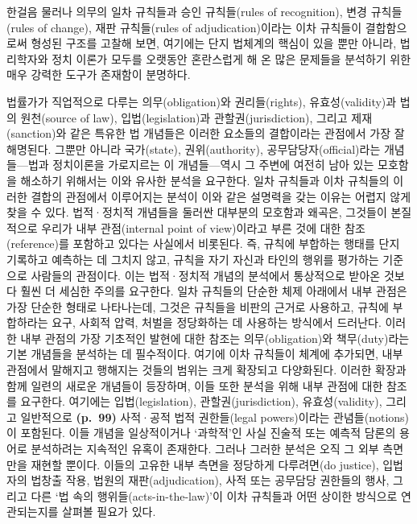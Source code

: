 한걸음 물러나 의무의 일차 규칙들과 승인 규칙들(rules of recognition),
변경 규칙들(rules of change), 재판 규칙들(rules of adjudication)이라는
이차 규칙들이 결합함으로써 형성된 구조를 고찰해 보면, 여기에는 단지
법체계의 핵심이 있을 뿐만 아니라, 법리학자와 정치 이론가 모두를 오랫동안
혼란스럽게 해 온 많은 문제들을 분석하기 위한 매우 강력한 도구가 존재함이
분명하다.

법률가가 직업적으로 다루는 의무(obligation)와 권리들(rights),
유효성(validity)과 법의 원천(source of law), 입법(legislation)과
관할권(jurisdiction), 그리고 제재(sanction)와 같은 특유한 법 개념들은
이러한 요소들의 결합이라는 관점에서 가장 잘 해명된다. 그뿐만 아니라
국가(state), 권위(authority), 공무담당자(official)라는 개념들---법과
정치이론을 가로지르는 이 개념들---역시 그 주변에 여전히 남아 있는
모호함을 해소하기 위해서는 이와 유사한 분석을 요구한다. 일차 규칙들과
이차 규칙들의 이러한 결합의 관점에서 이루어지는 분석이 이와 같은
설명력을 갖는 이유는 어렵지 않게 찾을 수 있다. 법적·정치적 개념들을
둘러싼 대부분의 모호함과 왜곡은, 그것들이 본질적으로 우리가 내부
관점(internal point of view)이라고 부른 것에 대한 참조(reference)를
포함하고 있다는 사실에서 비롯된다. 즉, 규칙에 부합하는 행태를 단지
기록하고 예측하는 데 그치지 않고, 규칙을 자기 자신과 타인의 행위를
평가하는 기준으로  사람들의 관점이다. 이는
법적·정치적 개념의 분석에서 통상적으로 받아온 것보다 훨씬 더 세심한
주의를 요구한다. 일차 규칙들의 단순한 체제 아래에서 내부 관점은 가장
단순한 형태로 나타나는데, 그것은 규칙들을 비판의 근거로 사용하고, 규칙에
부합하라는 요구, 사회적 압력, 처벌을 정당화하는 데 사용하는 방식에서
드러난다. 이러한 내부 관점의 가장 기초적인 발현에 대한 참조는
의무(obligation)와 책무(duty)라는 기본 개념들을 분석하는 데 필수적이다.
여기에 이차 규칙들이 체계에 추가되면, 내부 관점에서 말해지고 행해지는
것들의 범위는 크게 확장되고 다양화된다. 이러한 확장과 함께 일련의 새로운
개념들이 등장하며, 이들 또한 분석을 위해 내부 관점에 대한 참조를
요구한다. 여기에는 입법(legislation), 관할권(jurisdiction),
유효성(validity), 그리고 일반적으로 \textbf{(p.~99)} 사적·공적 법적
권한들(legal powers)이라는 관념들(notions)이 포함된다. 이들 개념을
일상적이거나 ‘과학적’인 사실 진술적 또는 예측적 담론의 용어로 분석하려는
지속적인 유혹이 존재한다. 그러나 그러한 분석은 오직 그 외부 측면만을
재현할 뿐이다. 이들의 고유한 내부 측면을 정당하게 다루려면(do justice),
입법자의 법창출 작용, 법원의 재판(adjudication), 사적 또는 공무담당
권한들의 행사, 그리고 다른 ‘법 속의 행위들(acts-in-the-law)’이 이차
규칙들과 어떤 상이한 방식으로 연관되는지를 살펴볼 필요가 있다.

